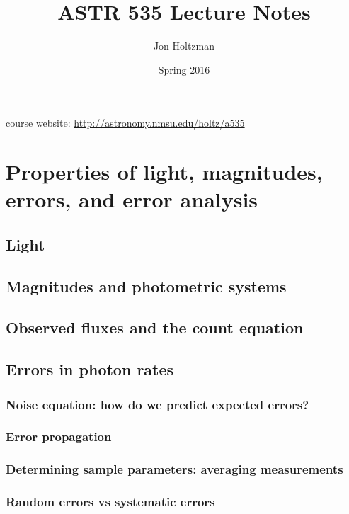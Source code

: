 \documentclass[12pt]{article}
\title{ASTR 535 Lecture Notes}
\author{Jon Holtzman}
\date{Spring 2016}
\begin{document}
\maketitle

\noindent course website: \textcolor{blue}{\url{http://astronomy.nmsu.edu/holtz/a535}}

\section*{Properties of light, magnitudes, errors, and error analysis}

\subsection*{Light}
\subsection*{Magnitudes and photometric systems}
\subsection*{Observed fluxes and the count equation}
\subsection*{Errors in photon rates}
\subsubsection*{Noise equation: how do we predict expected errors?}
\subsubsection*{Error propagation}
\subsubsection*{Determining sample parameters: averaging measurements}
\subsubsection*{Random errors vs systematic errors}
\end{document}
